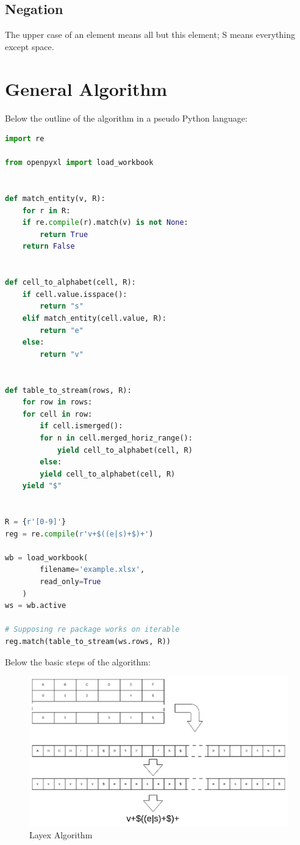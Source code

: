 \documentclass{article}
\begin{document}
\subsection{Negation}
The upper case of an element means all but this element; S means everything except space.

\section{General Algorithm}
Below the outline of the algorithm in a pseudo Python language:
\begin{lstlisting}[language=Python, caption=Layex Algorithm]
import re

from openpyxl import load_workbook


def match_entity(v, R):
    for r in R:
    if re.compile(r).match(v) is not None:
        return True
    return False


def cell_to_alphabet(cell, R):
    if cell.value.isspace():
        return "s"
    elif match_entity(cell.value, R):
        return "e"
    else:
        return "v"


def table_to_stream(rows, R):
    for row in rows:
    for cell in row:
        if cell.ismerged():
        for n in cell.merged_horiz_range():
            yield cell_to_alphabet(cell, R)
        else:
        yield cell_to_alphabet(cell, R)
    yield "$"


R = {r'[0-9]'}
reg = re.compile(r'v+$((e|s)+$)+')

wb = load_workbook(
        filename='example.xlsx',
        read_only=True
    )
ws = wb.active

# Supposing re package works on iterable
reg.match(table_to_stream(ws.rows, R))
\end{lstlisting}
Below the basic steps of the algorithm:
\begin{figure}[H]
\caption{Layex Algorithm}
\includegraphics[width=\columnwidth]{layex_algorithm.drawio}
\end{figure}
\end{document}
